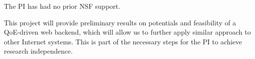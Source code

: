 
 The PI has had no prior NSF support.

This project will provide preliminary results on potentials and feasibility of a QoE-driven web backend, which will allow us to further apply similar approach to other Internet systems. This is part of the necessary steps for the PI to achieve research independence.










